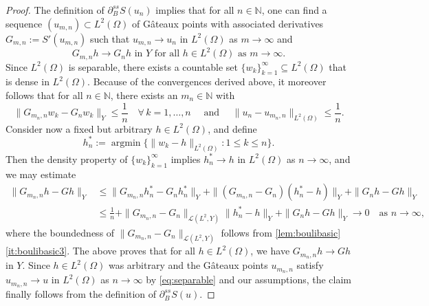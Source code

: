 \documentclass[reqno]{shinyart}
\begin{document}
\begin{proof}
    The definition of $\partial_{B}^{ss} S(u_n)$ implies that 
    for all $n \in \mathbb{N}$, one can find a sequence  $(u_{m,n}) \subset L^2(\Omega)$ of G\^ateaux points 
    with associated derivatives $G_{m, n}:= S'(u_{m,n})$ 
    such that $u_{m, n} \to u_n$ in $L^2(\Omega)$ as $m \to \infty$ and
    \begin{equation*}
        G_{m,n}h \to G_n h \text{ in } Y
        \text{ for all }h \in L^2(\Omega) \text{ as }m\to \infty. 
    \end{equation*}
    Since $L^2(\Omega)$ is separable, there exists a countable set 
    $\{w_k\}_{k=1}^\infty \subseteq L^2(\Omega)$ that is dense in $L^2(\Omega)$. 
    Because of the convergences derived above, it moreover follows that 
    for all $n \in \mathbb{N}$, there exists an $m_n \in \mathbb{N}$ with
    \begin{equation}\label{eq:separable}
        \| G_{m_n,n}w_k - G_n w_k\|_Y \leq \frac{1}{n}\quad \forall \, k=1,\dots,n 
        \quad \text{ and } \quad \| u_n - u_{m_n, n}\| _{L^2(\Omega)} \leq \frac{1}{n}. 
    \end{equation}
    Consider now a fixed but arbitrary $h \in L^2(\Omega)$, and define
    \begin{equation*}
        h^*_n := {\operatorname{argmin}}\{\| w_k - h\|_{L^2(\Omega)} : 1 \leq k \leq n\}.
    \end{equation*}
    Then the density property of $\{w_k\}_{k=1}^\infty$ implies $h^*_n \to h$ in $L^2(\Omega)$ 
    as $n \to \infty$, and we may estimate
    \begin{equation*}
        \begin{aligned}
            \|G_{m_n, n}h  -  G h\|_Y
            &\leq \| G_{m_n, n} h_n^*  -  G_n h_n^*\|_Y + 
            \|(G_{m_n, n} - G_n) (h_n^*  -  h)\|_Y + \|G_n h - G h\|_Y\\
            &\leq \frac{1}{n} + \|G_{m_n,n} - G_n\|_{{\mathcal{L}}(L^2,Y)}
            \|h_n^* - h\|_Y + \|G_n h - G h\|_Y \to 0 \quad \text{as } n \to \infty,
        \end{aligned}
    \end{equation*}
    where the boundedness of $\|G_{m_n,n} - G_n\|_{{\mathcal{L}}(L^2,Y)}$ follows from 
    \cref{lem:boulibasic}\ref{it:boulibasic3}. 
    The above proves that for all $h \in L^2(\Omega)$, we have  
    $G_{m_n,n}h \to  G h$ in $Y$. Since $h\in L^2(\Omega)$
    was arbitrary and the G\^ateaux points $u_{m_n,n}$ 
    satisfy $u_{m_n,n} \to u$ in $L^2(\Omega)$ as $n\to \infty$ by \eqref{eq:separable} and 
    our assumptions, the claim finally follows from the definition of $\partial_{B}^{ss} S(u)$.
\end{proof}
\end{document}
